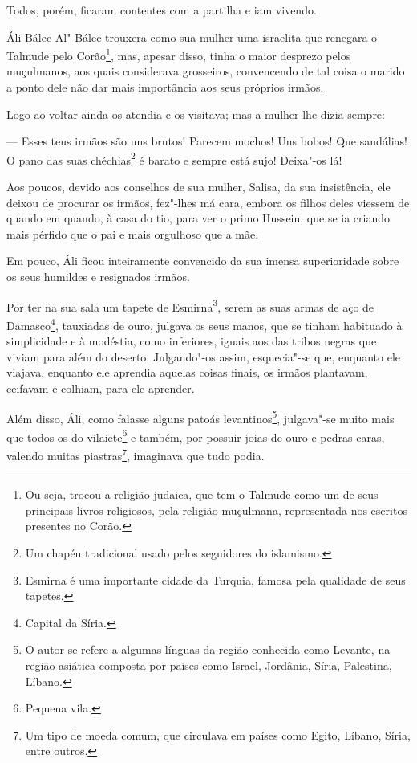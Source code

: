Todos, porém, ficaram contentes com a partilha e iam vivendo.

Áli Bálec Al"-Bálec trouxera como sua mulher uma israelita que renegara o
Talmude pelo Corão\footnote{Ou seja, trocou a religião judaica, que tem
  o Talmude como um de seus principais livros religiosos, pela religião
  muçulmana, representada nos escritos presentes no Corão.}, mas, apesar
disso, tinha o maior desprezo pelos muçulmanos, aos quais considerava
grosseiros, convencendo de tal coisa o marido a ponto dele não dar mais
importância aos seus próprios irmãos.

Logo ao voltar ainda os atendia e os visitava; mas a mulher lhe dizia
sempre:

--- Esses teus irmãos são uns brutos! Parecem mochos! Uns bobos! Que
sandálias! O pano das suas chéchias\footnote{Um chapéu tradicional usado
  pelos seguidores do islamismo.} é barato e sempre está sujo! Deixa"-os
lá!

Aos poucos, devido aos conselhos de sua mulher, Salisa, da sua
insistência, ele deixou de procurar os irmãos, fez"-lhes má cara, embora
os filhos deles viessem de quando em quando, à casa do tio, para ver o
primo Hussein, que se ia criando mais pérfido que o pai e mais orgulhoso
que a mãe.

Em pouco, Áli ficou inteiramente convencido da sua imensa superioridade
sobre os seus humildes e resignados irmãos.

Por ter na sua sala um tapete de Esmirna\footnote{Esmirna é uma
  importante cidade da Turquia, famosa pela qualidade de seus tapetes.},
serem as suas armas de aço de Damasco\footnote{Capital da Síria.},
tauxiadas de ouro, julgava os seus manos, que se tinham habituado à
simplicidade e à modéstia, como inferiores, iguais aos das tribos negras
que viviam para além do deserto. Julgando"-os assim, esquecia"-se que,
enquanto ele viajava, enquanto ele aprendia aquelas coisas finais, os
irmãos plantavam, ceifavam e colhiam, para ele aprender.

Além disso, Áli, como falasse alguns patoás levantinos\footnote{O autor
  se refere a algumas línguas da região conhecida como Levante, na
  região asiática composta por países como Israel, Jordânia, Síria,
  Palestina, Líbano.}, julgava"-se muito mais que todos os do
vilaiete\footnote{Pequena vila.} e também, por possuir joias de ouro e
pedras caras, valendo muitas piastras\footnote{Um tipo de moeda comum,
  que circulava em países como Egito, Líbano, Síria, entre outros.},
imaginava que tudo podia.

